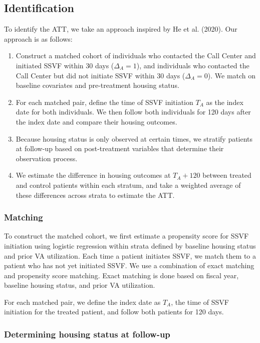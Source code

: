 \subsection{Identification}
To identify the ATT, we take an approach inspired by He et al. (2020). Our approach is as follows:

\begin{enumerate}
    \item Construct a matched cohort of individuals who contacted the Call Center and initiated SSVF within 30 days ($\Delta_A = 1$), and individuals who contacted the Call Center but did not initiate SSVF within 30 days ($\Delta_A = 0$). We match on baseline covariates and pre-treatment housing status.
    \item For each matched pair, define the time of SSVF initiation $T_A$ as the index date for both individuals. We then follow both individuals for 120 days after the index date and compare their housing outcomes.
    \item Because housing status is only observed at certain times, we stratify patients at follow-up based on post-treatment variables that determine their observation process.
    \item We estimate the difference in housing outcomes at $T_A + 120$ between treated and control patients within each stratum, and take a weighted average of these differences across strata to estimate the ATT.
\end{enumerate}

\subsubsection{Matching}
To construct the matched cohort, we first estimate a propensity score for SSVF initiation using logistic regression within strata defined by baseline housing status and prior VA utilization. Each time a patient initiates SSVF, we match them to a patient who has not yet initiated SSVF. We use a combination of exact matching and propensity score matching. Exact matching is done based on fiscal year, baseline housing status, and prior VA utilization.

For each matched pair, we define the index date as $T_A$, the time of SSVF initiation for the treated patient, and follow both patients for 120 days.

\subsubsection{Determining housing status at follow-up}

